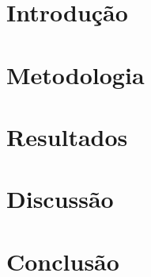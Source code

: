 


\maketitle

\begin{abstract}
Este trabalho analisa 9.075 Pull Requests de 197 repositórios populares do GitHub,
investigando relações entre tamanho, tempo de análise, descrição e interações
com o status de merge e número de revisões. Utilizamos correlação de \spearman
e testes de significância para responder a sete questões de pesquisa.
Os resultados indicam que o tempo de análise é o fator mais fortemente associado
ao status de merge, enquanto o tamanho do PR apresenta correlação moderada
com o número de revisões.
\end{abstract}

\section{Introdução}


\section{Metodologia}


\section{Resultados}


\section{Discussão}


\section{Conclusão}



